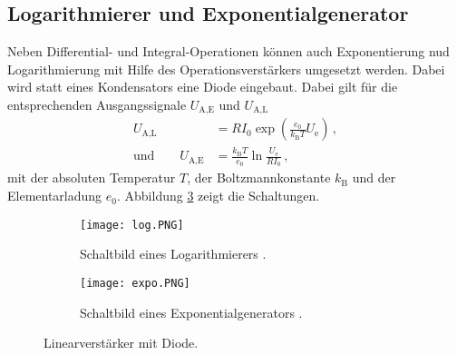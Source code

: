\documentclass[
  bibliography=totoc,     %
  captions=tableheading,  %
  titlepage=firstiscover, %
]{scrartcl}
\begin{document}
\subsection{Logarithmierer und Exponentialgenerator}
\label{subsec:log_expo}
Neben Differential- und Integral-Operationen können auch Exponentierung nud
Logarithmierung mit Hilfe des Operationsverstärkers umgesetzt werden.
Dabei wird statt eines Kondensators eine Diode eingebaut.
Dabei gilt für die entsprechenden Ausgangssignale $U_\text{A,E}$ und
$U_\text{A,L}$
\begin{align*}
    U_\text{A,L} &= R I_0 \exp\left(\frac{e_0}{k_\text{B}T} U_\text{e}\right)\,,\\
    \text{und} \qquad U_\text{A,E} &= \frac{k_\text{B}T}{e_0}\ln \frac{U_\text{e}}{R I_0}\,,
\end{align*}
mit der absoluten Temperatur $T$, der Boltzmannkonstante $k_\text{B}$ und
der Elementarladung $e_0$. Abbildung \ref{fig:log_expo} zeigt die Schaltungen.
\begin{figure}[H]
    \begin{subfigure}{.49\linewidth}
        \centering
        \texttt{[image: log.PNG]}
        \caption{Schaltbild eines Logarithmierers \cite{V51}.}
        \label{fig:log}
    \end{subfigure}
    \begin{subfigure}{.49\linewidth}
        \centering
        \texttt{[image: expo.PNG]}
        \caption{Schaltbild eines Exponentialgenerators \cite{V51}.}
        \label{fig:expo}
    \end{subfigure}
    \caption{Linearverstärker mit Diode.}
    \label{fig:log_expo}
\end{figure}
\end{document}

